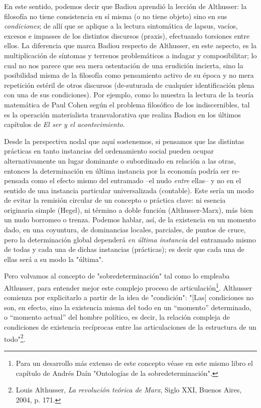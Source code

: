 En este sentido, podemos decir que Badiou aprendió la lección de
Althusser: la filosofía no tiene consistencia en sí misma (o no tiene
objeto) sino en sus \emph{condiciones}; de allí que se aplique a la
lectura sintomática de lapsus, vacíos, excesos e impasses de los
distintos discursos (praxis), efectuando torsiones entre ellos. La
diferencia que marca Badiou respecto de Althusser, en este aspecto, es
la multiplicación de síntomas y terrenos problemáticos a indagar y
composibilitar; lo cual no nos parece que sea mera ostentación de una
erudición incierta, sino la posibilidad misma de la filosofía como
pensamiento activo de su época y no mera repetición estéril de otros
discursos (de-suturada de cualquier identificación plena con una de sus
condiciones). Por ejemplo, como lo muestra la lectura de la teoría
matemática de Paul Cohen según el problema filosófico de los
indiscernibles, tal es la operación materialista transvalorativa que
realiza Badiou en los últimos capítulos de \emph{El ser y el
acontecimiento}.

Desde la perspectiva nodal que aquí sostenemos, si pensamos que las
distintas prácticas en tanto instancias del ordenamiento social pueden
ocupar alternativamente un lugar dominante o subordinado en relación a
las otras, entonces la determinación en última instancia por la economía
podría ser re-pensada como el efecto mismo del entramado --el nudo
\emph{entre} ellas-- y no en el sentido de una instancia particular
universalizada (contable). Este sería un modo de evitar la remisión
circular de un concepto o práctica clave: ni esencia originaria simple
(Hegel), ni término a doble función (Althusser-Marx), más bien un nudo
borromeo o trenza. Podemos hablar, así, de la existencia en un momento
dado, en una coyuntura, de dominancias locales, parciales, de puntos de
cruce, pero la determinación global dependerá \emph{en última instancia}
del entramado mismo de todas y cada una de dichas instancias
(prácticas); es decir que cada una de ellas será a su modo la "última".

Pero volvamos al concepto de "sobredeterminación" tal como lo empleaba
Althusser, para entender mejor este complejo proceso de
articulación\footnote{Para un desarrollo más extenso de este concepto
  véase en este mismo libro el capítulo de Andrés Daín "Ontologías de la
  sobredeterminación".}. Althusser comienza por explicitarlo a partir de
la idea de "condición": "{[}Las{]} condiciones no son, en efecto, sino
la existencia misma del todo en un ``momento'' determinado, o ``momento
actual'' del hombre político, es decir, la relación compleja de
condiciones de existencia recíprocas entre las articulaciones de la
estructura de un todo"\footnote{Louis Althusser, \emph{La revolución
  teórica de Marx}, Siglo XXI, Buenos Aires, 2004, p. 171.}.

